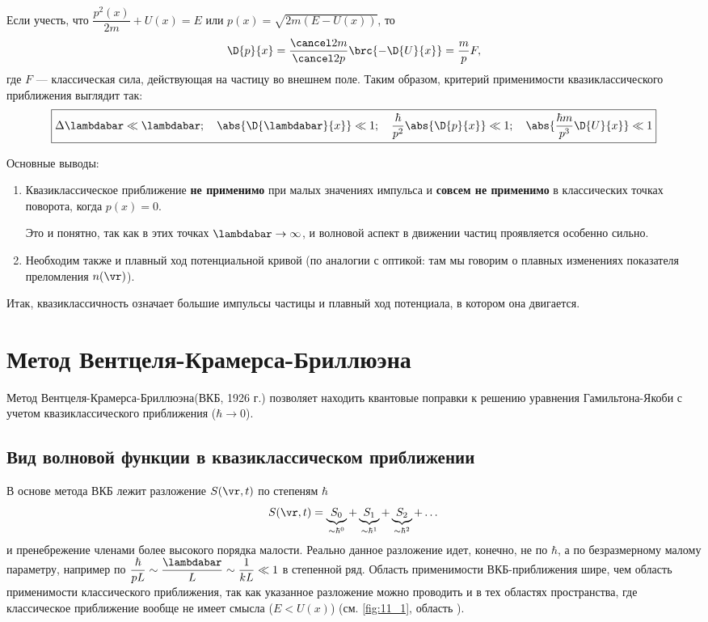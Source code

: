 Если учесть, что $\dfrac{p^2(x)}{2m} + U(x) = E$ или $p(x)=\sqrt{2m(E-U(x))}$, то 
$$
\D{p}{x}=\frac{\cancel 2m}{\cancel 2 p}\brc{-\D{U}{x}} = \frac{m}{p}F,
$$
где $F$ --- классическая сила, действующая на частицу во внешнем поле. Таким образом, критерий применимости квазиклассического приближения выглядит так:
$$
\boxed{\Delta \lambdabar \ll \lambdabar;~~~\abs{\D{\lambdabar}{x}} \ll 1;~~~\frac{\hbar}{p^2} \abs{\D{p}{x}} \ll 1; ~~~\abs{\frac{\hbar m}{p^3} \D{U}{x}} \ll 1 }
$$

Основные выводы:

\begin{enumerate}
\item Квазиклассическое приближение {\bf не применимо} при малых значениях импульса и {\bf совсем не применимо} в классических точках поворота, когда $p(x)=0$. 

Это и понятно, так как в этих точках $\lambdabar \to \infty$, и волновой аспект в движении частиц проявляется особенно сильно.
\item Необходим также и плавный ход потенциальной кривой (по аналогии с оптикой: там мы говорим о плавных изменениях показателя преломления $n(\vr)$).
\end{enumerate}

Итак, квазиклассичность означает большие импульсы частицы и плавный ход потенциала, в котором она двигается. 

\section{Метод Вентцеля-Крамерса-Бриллюэна}

Метод Вентцеля-Крамерса-Бриллюэна\footnotemark (ВКБ, 1926 г.) позволяет находить квантовые поправки к решению уравнения Гамильтона-Якоби с учетом квазиклассического приближения ($\hbar \to 0$).

 
\subsection{Вид волновой функции в квазиклассическом приближении}

В основе метода ВКБ лежит разложение $S(\vr,t)$ по степеням $\hbar$
$$
S(\vr,t) = \underbrace{S_0}_{\sim \hbar^0}
         + \underbrace{S_1}_{\sim \hbar^1}
         + \underbrace{S_2}_{\sim \hbar^2} + \dots
$$%
%
и пренебрежение членами более высокого порядка малости. Реально данное разложение идет, конечно, не по $\hbar$, а по безразмерному малому параметру, например по $\dfrac{\hbar}{pL} \sim \dfrac{\lambdabar}{L} \sim \dfrac{1}{kL} \ll 1$ в степенной ряд. Область применимости ВКБ-приближения шире, чем область применимости классического приближения, так как указанное разложение можно проводить и в тех областях пространства, где классическое приближение вообще не имеет смысла ($E < U(x)$) (см. \autoref{fig:11_1}, область ).

